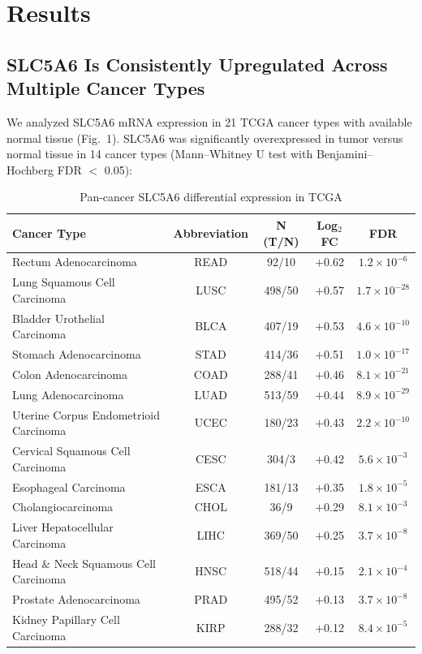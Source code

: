 \documentclass[10pt,letterpaper]{article}
\begin{document}

\section*{Results}

\subsection*{SLC5A6 Is Consistently Upregulated Across Multiple Cancer Types}

We analyzed SLC5A6 mRNA expression in 21 TCGA cancer types with available normal tissue (Fig.~1). SLC5A6 was significantly overexpressed in tumor versus normal tissue in 14 cancer types (Mann--Whitney U test with Benjamini--Hochberg FDR $<$ 0.05):

\begin{table}[t]
\centering
\caption{Pan-cancer SLC5A6 differential expression in TCGA}
\label{tab:expression}
\begin{tabular}{lcccc}
\toprule
Cancer Type & Abbreviation & N (T/N) & Log$_2$FC & FDR \\
\midrule
Rectum Adenocarcinoma          & READ & 92/10 & $+$0.62 & $1.2\times10^{-6}$ \\
Lung Squamous Cell Carcinoma  & LUSC & 498/50 & $+$0.57 & $1.7\times10^{-28}$ \\
Bladder Urothelial Carcinoma  & BLCA & 407/19 & $+$0.53 & $4.6\times10^{-10}$ \\
Stomach Adenocarcinoma        & STAD & 414/36 & $+$0.51 & $1.0\times10^{-17}$ \\
Colon Adenocarcinoma          & COAD & 288/41 & $+$0.46 & $8.1\times10^{-21}$ \\
Lung Adenocarcinoma           & LUAD & 513/59 & $+$0.44 & $8.9\times10^{-29}$ \\
Uterine Corpus Endometrioid Carcinoma & UCEC & 180/23 & $+$0.43 & $2.2\times10^{-10}$ \\
Cervical Squamous Cell Carcinoma & CESC & 304/3 & $+$0.42 & $5.6\times10^{-3}$ \\
Esophageal Carcinoma          & ESCA & 181/13 & $+$0.35 & $1.8\times10^{-5}$ \\
Cholangiocarcinoma           & CHOL & 36/9 & $+$0.29 & $8.1\times10^{-3}$ \\
Liver Hepatocellular Carcinoma & LIHC & 369/50 & $+$0.25 & $3.7\times10^{-8}$ \\
Head \& Neck Squamous Cell Carcinoma & HNSC & 518/44 & $+$0.15 & $2.1\times10^{-4}$ \\
Prostate Adenocarcinoma        & PRAD & 495/52 & $+$0.13 & $3.7\times10^{-8}$ \\
Kidney Papillary Cell Carcinoma & KIRP & 288/32 & $+$0.12 & $8.4\times10^{-5}$ \\
\bottomrule
\end{tabular}
\end{table}
\end{document}
